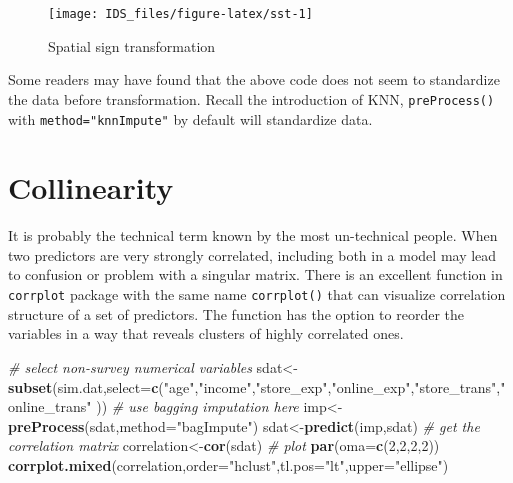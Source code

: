 \documentclass[12pt,]{krantz}
\newenvironment{Shaded}{\begin{snugshade}}{\end{snugshade}}
\newcommand{\KeywordTok}[1]{\textcolor[rgb]{0.13,0.29,0.53}{\textbf{{#1}}}}
\newcommand{\DataTypeTok}[1]{\textcolor[rgb]{0.13,0.29,0.53}{{#1}}}
\newcommand{\DecValTok}[1]{\textcolor[rgb]{0.00,0.00,0.81}{{#1}}}
\newcommand{\StringTok}[1]{\textcolor[rgb]{0.31,0.60,0.02}{{#1}}}
\newcommand{\CommentTok}[1]{\textcolor[rgb]{0.56,0.35,0.01}{\textit{{#1}}}}
\newcommand{\NormalTok}[1]{{#1}}
\theoremstyle{definition}
\theoremstyle{definition}
\theoremstyle{remark}
\begin{document}
\begin{figure}

{\centering \texttt{[image: IDS\_files/figure-latex/sst-1]} 

}

\caption{Spatial sign transformation}\label{fig:sst}
\end{figure}

Some readers may have found that the above code does not seem to
standardize the data before transformation. Recall the introduction of
KNN, \texttt{preProcess()} with \texttt{method="knnImpute"} by default
will standardize data.

\section{Collinearity}\label{collinearity}

It is probably the technical term known by the most un-technical people.
When two predictors are very strongly correlated, including both in a
model may lead to confusion or problem with a singular matrix. There is
an excellent function in \texttt{corrplot} package with the same name
\texttt{corrplot()} that can visualize correlation structure of a set of
predictors. The function has the option to reorder the variables in a
way that reveals clusters of highly correlated ones.

\begin{Shaded}
\begin{Highlighting}[]
\CommentTok{# select non-survey numerical variables}
\NormalTok{sdat<-}\KeywordTok{subset}\NormalTok{(sim.dat,}\DataTypeTok{select=}\KeywordTok{c}\NormalTok{(}\StringTok{"age"}\NormalTok{,}\StringTok{"income"}\NormalTok{,}\StringTok{"store_exp"}\NormalTok{,}\StringTok{"online_exp"}\NormalTok{,}\StringTok{"store_trans"}\NormalTok{,}\StringTok{"online_trans"} \NormalTok{))}
\CommentTok{# use bagging imputation here}
\NormalTok{imp<-}\KeywordTok{preProcess}\NormalTok{(sdat,}\DataTypeTok{method=}\StringTok{"bagImpute"}\NormalTok{)}
\NormalTok{sdat<-}\KeywordTok{predict}\NormalTok{(imp,sdat)}
\CommentTok{# get the correlation matrix}
\NormalTok{correlation<-}\KeywordTok{cor}\NormalTok{(sdat)}
\CommentTok{# plot }
\KeywordTok{par}\NormalTok{(}\DataTypeTok{oma=}\KeywordTok{c}\NormalTok{(}\DecValTok{2}\NormalTok{,}\DecValTok{2}\NormalTok{,}\DecValTok{2}\NormalTok{,}\DecValTok{2}\NormalTok{))}
\KeywordTok{corrplot.mixed}\NormalTok{(correlation,}\DataTypeTok{order=}\StringTok{"hclust"}\NormalTok{,}\DataTypeTok{tl.pos=}\StringTok{"lt"}\NormalTok{,}\DataTypeTok{upper=}\StringTok{"ellipse"}\NormalTok{)}
\end{Highlighting}
\end{Shaded}
\end{document}
